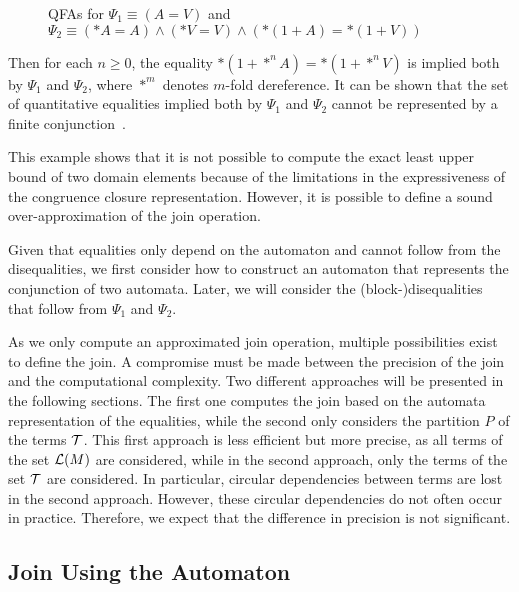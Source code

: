 \begin{example}
\begin{figure}
\begin{minipage}{0.65\textwidth}
        \end{minipage}
    \caption{QFAs for $\Psi_1 \equiv (A = V)$ and $\Psi_2 \equiv (*A = A)\land (*V=V) \land (*(1 + A) = *(1 + V))$}\label{qfa-infinite-join}
\end{figure}
    Then for each $n \geq 0$, the equality $*(1+*^n A) = *(1 + *^n V)$ is implied both by $\Psi_1$ and $\Psi_2$, where $*^m$ denotes $m$-fold dereference.
    It can be shown that the set of quantitative equalities implied both by $\Psi_1$ and $\Psi_2$ cannot be represented by a finite conjunction~\cite{join, 2pointer}.
\end{example}

This example shows that it is not possible to compute the exact least upper bound of two domain elements because of the limitations in the expressiveness of the congruence closure representation.
However, it is possible to define a sound over-approximation of the join operation.

Given that equalities only depend on the automaton and cannot follow from the disequalities, we first consider how to construct an automaton that represents the conjunction of two automata.
Later, we will consider the (block-)disequalities that follow from $\Psi_1$ and $\Psi_2$.

As we only compute an approximated join operation, multiple possibilities exist to define the join.
A compromise must be made between the precision of the join and the computational complexity.
Two different approaches will be presented in the following sections.
The first one computes the join based on the automata representation of the equalities, while the second only considers the partition $P$ of the terms $\mathcal{T}$.
This first approach is less efficient but more precise, as all terms of the set $\mathcal{L}(M)$ are considered, while in the second approach, only the terms of the set $\mathcal{T}$ are considered.
In particular, circular dependencies between terms are lost in the second approach.
However, these circular dependencies do not often occur in practice.
Therefore, we expect that the difference in precision is not significant.

\subsection{Join Using the Automaton}

